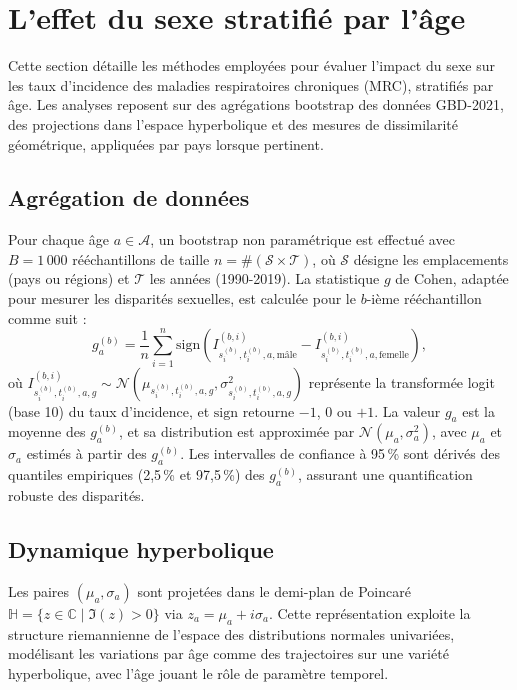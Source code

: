 \section{L'effet du sexe stratifié par l'âge}

Cette section détaille les méthodes employées pour évaluer l'impact du sexe sur les taux d'incidence des maladies respiratoires chroniques (MRC), stratifiés par âge. Les analyses reposent sur des agrégations bootstrap des données GBD-2021, des projections dans l'espace hyperbolique et des mesures de dissimilarité géométrique, appliquées par pays lorsque pertinent.

\subsection{Agrégation de données}

Pour chaque âge $a \in \mathcal{A}$, un bootstrap non paramétrique est effectué avec $B = 1\,000$ rééchantillons de taille $n = \#(\mathcal{S} \times \mathcal{T})$, où $\mathcal{S}$ désigne les emplacements (pays ou régions) et $\mathcal{T}$ les années (1990-2019). La statistique $g$ de Cohen, adaptée pour mesurer les disparités sexuelles, est calculée pour le $b$-ième rééchantillon comme suit :
\[
g_a^{(b)} = \frac{1}{n} \sum_{i=1}^n \mathrm{sign} \left( I_{s_i^{(b)}, t_i^{(b)}, a, \mathrm{mâle}}^{(b,i)} - I_{s_i^{(b)}, t_i^{(b)}, a, \mathrm{femelle}}^{(b,i)} \right),
\]
où $I_{s_i^{(b)}, t_i^{(b)}, a, g}^{(b,i)} \sim \mathcal{N}(\mu_{s_i^{(b)}, t_i^{(b)}, a, g}, \sigma_{s_i^{(b)}, t_i^{(b)}, a, g}^2)$ représente la transformée logit (base 10) du taux d'incidence, et $\mathrm{sign}$ retourne $-1$, $0$ ou $+1$. La valeur $g_a$ est la moyenne des $g_a^{(b)}$, et sa distribution est approximée par $\mathcal{N}(\mu_a, \sigma_a^2)$, avec $\mu_a$ et $\sigma_a$ estimés à partir des $g_a^{(b)}$. Les intervalles de confiance à 95\,\% sont dérivés des quantiles empiriques (2,5\,\% et 97,5\,\%) des $g_a^{(b)}$, assurant une quantification robuste des disparités.

\subsection{Dynamique hyperbolique}

Les paires $(\mu_a, \sigma_a)$ sont projetées dans le demi-plan de Poincaré $\mathbb{H} = \{ z \in \mathbb{C} \mid \Im(z) > 0 \}$ via $z_a = \mu_a + i \sigma_a$. Cette représentation exploite la structure riemannienne de l'espace des distributions normales univariées, modélisant les variations par âge comme des trajectoires sur une variété hyperbolique, avec l'âge jouant le rôle de paramètre temporel.

